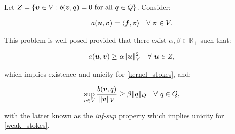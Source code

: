 Let $Z = \{\bm{v} \in V: b(\bm{v}, q) = 0 \text{ for all } q \in Q\}$. Consider:

\begin{gather} \label{kernel_stokes}
    a(\bm{u}, \bm{v}) = \langle \bm{f}, \bm{v} \rangle \quad \forall ~ \bm{v} \in V.
\end{gather}

This problem is well-posed provided that there exist $\alpha, \beta \in \mathbb{R}_+$ such that:

\begin{gather} \label{coercivity}
    a(\bm{u}, \bm{v}) \geq \alpha \lVert \bm{u} \rVert^2_V \quad \forall ~ \bm{u} \in Z,
\end{gather}

which implies existence and unicity for \eqref{kernel_stokes}, and:

\begin{gather} \label{inf-sup}
    \sup_{\bm{v} \in V} \frac{b(\bm{v}, q)}{\lVert \bm{v} \rVert_V} \geq \beta \lVert q \rVert_Q \quad \forall ~ q \in Q,
\end{gather}

with the latter known as the \textit{inf-sup} property which implies unicity for \eqref{weak_stokes}.